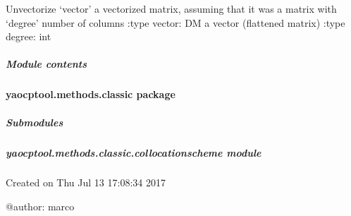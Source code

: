 \documentclass[letterpaper,10pt,english]{sphinxmanual}
\begin{document}
\begin{fulllineitems}

\begin{fulllineitems}
\label{\detokenize{yaocptool.methods.base:yaocptool.methods.base.solutionmethodsbase.SolutionMethodsBase.unvec}}
Unvectorize ‘vector’ a vectorized matrix, assuming that it was a matrix with ‘degree’ number of columns
:type vector: DM a vector (flattened matrix)
:type degree: int

\end{fulllineitems}


\end{fulllineitems}



\subparagraph{Module contents}
\label{\detokenize{yaocptool.methods.base:module-yaocptool.methods.base}}\label{\detokenize{yaocptool.methods.base:module-contents}}

\paragraph{yaocptool.methods.classic package}
\label{\detokenize{yaocptool.methods.classic:yaocptool-methods-classic-package}}\label{\detokenize{yaocptool.methods.classic::doc}}

\subparagraph{Submodules}
\label{\detokenize{yaocptool.methods.classic:submodules}}

\subparagraph{yaocptool.methods.classic.collocationscheme module}
\label{\detokenize{yaocptool.methods.classic:module-yaocptool.methods.classic.collocationscheme}}\label{\detokenize{yaocptool.methods.classic:yaocptool-methods-classic-collocationscheme-module}}
Created on Thu Jul 13 17:08:34 2017

@author: marco
\end{document}
